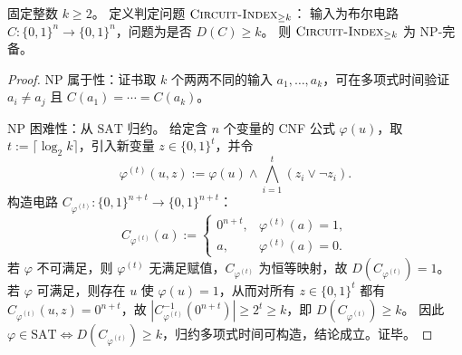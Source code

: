 \begin{theorem}\label{thm:circuit-index-ge-k-np-complete}
固定整数 \(k\ge 2\)。
定义判定问题 \(\textsc{Circuit-Index}_{\ge k}\)：
输入为布尔电路 \(C:\{0,1\}^n\to\{0,1\}^n\)，问题为是否 \(D(C)\ge k\)。
则 \(\textsc{Circuit-Index}_{\ge k}\) 为 \(\mathrm{NP}\)-完备。
\end{theorem}
\begin{proof}
\(\mathrm{NP}\) 属于性：证书取 \(k\) 个两两不同的输入 \(a_1,\dots,a_k\)，可在多项式时间验证 \(a_i\neq a_j\) 且 \(C(a_1)=\cdots=C(a_k)\)。
\par
\(\mathrm{NP}\) 困难性：从 \(\mathrm{SAT}\) 归约。
给定含 \(n\) 个变量的 CNF 公式 \(\varphi(u)\)，取 \(t:=\lceil\log_2 k\rceil\)，引入新变量 \(z\in\{0,1\}^t\)，并令
\[
\varphi^{(t)}(u,z):=\varphi(u)\wedge \bigwedge_{i=1}^{t}(z_i\vee\neg z_i).
\]
构造电路 \(C_{\varphi^{(t)}}:\{0,1\}^{n+t}\to\{0,1\}^{n+t}\)：
\[
C_{\varphi^{(t)}}(a):=
\begin{cases}
0^{n+t}, & \varphi^{(t)}(a)=1,\\
a, & \varphi^{(t)}(a)=0.
\end{cases}
\]
若 \(\varphi\) 不可满足，则 \(\varphi^{(t)}\) 无满足赋值，\(C_{\varphi^{(t)}}\) 为恒等映射，故 \(D(C_{\varphi^{(t)}})=1\)。
若 \(\varphi\) 可满足，则存在 \(u\) 使 \(\varphi(u)=1\)，从而对所有 \(z\in\{0,1\}^t\) 都有 \(C_{\varphi^{(t)}}(u,z)=0^{n+t}\)，故
\(
|C_{\varphi^{(t)}}^{-1}(0^{n+t})|\ge 2^t\ge k
\)，即 \(D(C_{\varphi^{(t)}})\ge k\)。
因此 \(\varphi\in\mathrm{SAT}\iff D(C_{\varphi^{(t)}})\ge k\)，归约多项式时间可构造，结论成立。证毕。
\end{proof}

